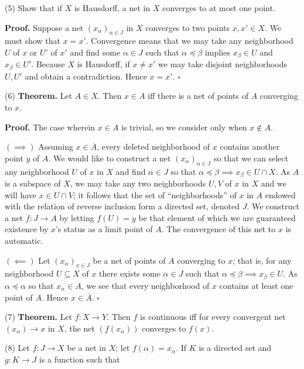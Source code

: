 \documentclass[a4paper]{article}
\begin{document}
(5) Show that if $X$ is Hausdorff, a net in $X$ converges to at most one point.

\textbf{Proof.} Suppose a net $(x_\alpha)_{\alpha \in J}$ in $X$ converges to two points $x, x' \in X$. We must show that $x = x'$. Convergence means that we may take any neighborhood $U$ of $x$ or $U'$ of $x'$ and find some $\alpha \in J$ such that $\alpha \preceq \beta$ implies $x_\beta \in U$ and $x_\beta \in U'$. Because $X$ is Hausdorff, if $x \neq x'$ we may take disjoint neighborhoods $U, U'$ and obtain a contradiction. Hence $x = x'$. $\square$

\vspace{0.5cm}

(6) \textbf{Theorem.} Let $A \in X$. Then $x \in \overline{A}$ iff there is a net of points of $A$ converging to $x$.

\textbf{Proof.} The case wherein $x \in A$ is trivial, so we consider only when $x \notin A$.

$(\implies)$ Assuming $x \in \overline{A}$, every deleted neighborhood of $x$ contains another point $y$ of $A$. We would like to construct a net $(x_\alpha)_{\alpha \in J}$ so that we can select any neighborhood $U$ of $x$ in $X$ and find $\alpha \in J$ so that $\alpha \preceq \beta \implies x_\beta \in U \cap X$. As $A$ is a subspace of $X$, we may take any two neighborhoods $U, V$ of $x$ in $X$ and we will have $x \in U \cap V$; it follows that the set of ``neighborhoods'' of $x$ in $A$ endowed with the relation of reverse inclusion form a directed set, denoted $J$. We construct a net $f : J \to A$ by letting $f(U) = y$ be that element of which we are guaranteed existence by $x$'s status as a limit point of $A$. The convergence of this net to $x$ is automatic.

$(\impliedby)$ Let $(x_\alpha)_{x \in J}$ be a net of points of $A$ converging to $x$; that is, for any neighborhood $U \subseteq X$ of $x$ there exists some $\alpha \in J$ such that $\alpha \preceq \beta \implies x_\beta \in U$. As $\alpha \preceq \alpha$ so that $x_\alpha \in A$, we see that every neighborhood of $x$ contains at least one point of $A$. Hence $x \in \overline{A}$. $\square$

\vspace{0.5cm}

(7) \textbf{Theorem.} Let $f : X \to Y$. Then $f$ is continuous iff for every convergent net $(x_\alpha) \to x$ in $X$, the net $(f(x_\alpha))$ converges to $f(x)$.

(8) Let $f : J \to X$ be a net in $X$; let $f(\alpha) = x_\alpha$. If $K$ is a directed set and $g : K \to J$ is a function such that
\end{document}
